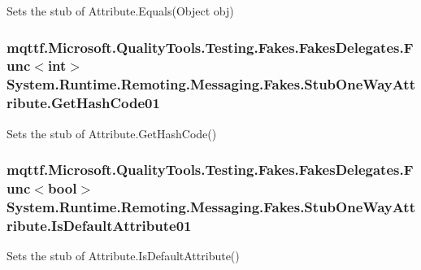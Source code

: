 Sets the stub of Attribute.\-Equals(\-Object obj)

\hypertarget{class_system_1_1_runtime_1_1_remoting_1_1_messaging_1_1_fakes_1_1_stub_one_way_attribute_a00067b7bc9ee15bc859af6c1d150ed2a}{
\subsubsection[{Get\-Hash\-Code01}]{\setlength{\rightskip}{0pt plus 5cm}mqttf.\-Microsoft.\-Quality\-Tools.\-Testing.\-Fakes.\-Fakes\-Delegates.\-Func$<$int$>$ System.\-Runtime.\-Remoting.\-Messaging.\-Fakes.\-Stub\-One\-Way\-Attribute.\-Get\-Hash\-Code01}}\label{class_system_1_1_runtime_1_1_remoting_1_1_messaging_1_1_fakes_1_1_stub_one_way_attribute_a00067b7bc9ee15bc859af6c1d150ed2a}


Sets the stub of Attribute.\-Get\-Hash\-Code()

\hypertarget{class_system_1_1_runtime_1_1_remoting_1_1_messaging_1_1_fakes_1_1_stub_one_way_attribute_a9457d22066d0fa895bbb1f1fda898c99}{
\subsubsection[{Is\-Default\-Attribute01}]{\setlength{\rightskip}{0pt plus 5cm}mqttf.\-Microsoft.\-Quality\-Tools.\-Testing.\-Fakes.\-Fakes\-Delegates.\-Func$<$bool$>$ System.\-Runtime.\-Remoting.\-Messaging.\-Fakes.\-Stub\-One\-Way\-Attribute.\-Is\-Default\-Attribute01}}\label{class_system_1_1_runtime_1_1_remoting_1_1_messaging_1_1_fakes_1_1_stub_one_way_attribute_a9457d22066d0fa895bbb1f1fda898c99}


Sets the stub of Attribute.\-Is\-Default\-Attribute()

